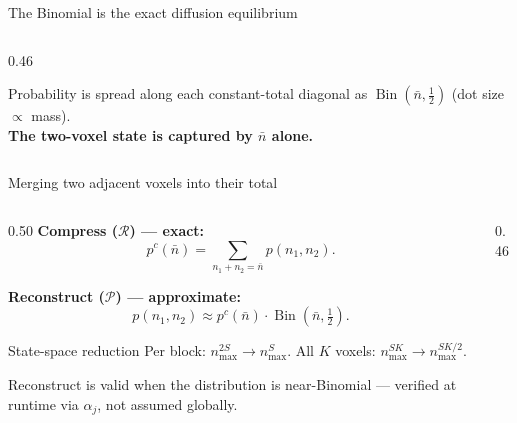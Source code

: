 \documentclass[10pt,aspectratio=169]{beamer}
\newcommand{\Bin}{\operatorname{Bin}}
\newcommand{\calR}{\mathcal{R}}
\newcommand{\calP}{\mathcal{P}}
\begin{document}
\begin{frame}{The Binomial is the exact diffusion equilibrium}
\begin{columns}[T]
\begin{column}{0.46\textwidth}
\begin{center}
      \vspace{0.4em}
      {\footnotesize
        Probability is spread along each constant-total diagonal
        as $\Bin(\bar n,\tfrac12)$ (dot size $\propto$ mass).\\[0.3em]
        \textbf{The two-voxel state is captured by $\bar n$ alone.}
      }
      \end{center}
    \end{column}
  \end{columns}

\end{frame}



\begin{frame}{Merging two adjacent voxels into their total}

  \begin{columns}[T]
    \begin{column}{0.50\textwidth}
      \textbf{Compress ($\calR$) — exact:}
      \[ p^c(\bar n) = \!\!\sum_{n_1 + n_2 = \bar n}\!\! p(n_1, n_2). \]

      \textbf{Reconstruct ($\calP$) — approximate:}
      \[ p(n_1, n_2) \approx p^c(\bar n)\cdot\Bin(\bar n,\tfrac{1}{2}). \]

      \begin{block}{State-space reduction}
        Per block: $n_{\max}^{2S} \to n_{\max}^{S}$.\quad
        All $K$ voxels: $n_{\max}^{SK} \to n_{\max}^{SK/2}$.
      \end{block}

      \smallskip
      {\small Reconstruct is valid when the distribution is near-Binomial
      — verified at runtime via $\alpha_j$, not assumed globally.}
    \end{column}
    \begin{column}{0.46\textwidth}
      \begin{center}
\end{center}
\end{column}
\end{columns}
\end{frame}
\end{document}
